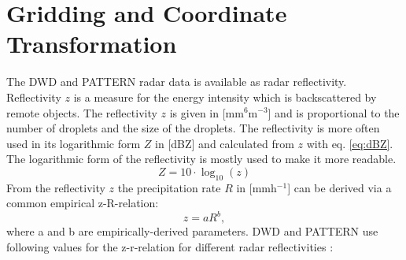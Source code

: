 \documentclass[11pt,twoside,a4paper,fleqn,x11names]{report}
\numberwithin{equation}{chapter}
\numberwithin{figure}{chapter}
\numberwithin{table}{chapter}
\begin{document}
\section{Gridding and Coordinate Transformation}
\label{subsec:grid}
The DWD and PATTERN radar data is available as radar reflectivity. Reflectivity $z$ is a measure for the energy intensity which is backscattered by remote objects. The reflectivity $z$ is given in [mm$^{6}$m$^{-3}$] and is proportional to the number of droplets and the size of the droplets. The reflectivity is more often used in its logarithmic form $Z$ in [dBZ] and calculated from $z$ with eq. \ref{eq:dBZ}. The logarithmic form of the reflectivity is mostly used to make it more readable.
\begin{equation}
Z  = 10 \cdot \log _{10}(z)
\label{eq:dBZ}
\end{equation}
From the reflectivity $z$ the precipitation rate $R$ in [mmh$^{-1}$] can be derived via a common empirical z-R-relation:
\begin{equation}
z = aR^{b},
\label{eq:zr}
\end{equation}
where a and b are empirically-derived parameters. DWD and PATTERN use following values for the z-r-relation for different radar reflectivities \citep{Lengfeld2014}:

\end{document}
